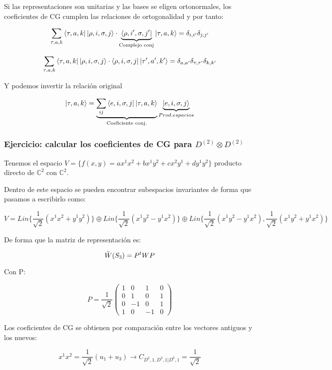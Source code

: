 \documentclass{article}
\begin{document}
\smallskip

Si las representaciones son unitarias y las bases se eligen ortonormales, los coeficientes de CG cumplen las relaciones de ortogonalidad y por tanto:


$$\sum_{\tau , a,k}\bra{\tau , a, k}\ket{\rho, i,  \sigma ,j } \cdot \underbrace{\bra{\rho, i',  \sigma ,j '}}_{\text{Complejo conj}} \ket{\tau , a, k}=\delta _{i,i'}\delta _{j,j'}$$

$$\sum_{\tau , a,k}\bra{\tau , a, k}\ket{\rho, i,  \sigma ,j } \cdot {\bra{\rho, i,  \sigma ,j }} \ket{\tau ' , a', k'}=\delta _{a,a'}\delta _{\tau,\tau '}\delta _{k, k'}$$


Y podemos invertir la relación original

$$\ket{\tau, a, k}=\underbrace{\sum _{ij} \bra{e,i, \sigma , j} \ket{ \tau , a ,k}}_{\text{Coeficiente conj.}} \underbrace{\ket{e,i,\sigma ,j}}_{Prod. espacios}$$

\subsubsection{Ejercicio: calcular los coeficientes de CG para $D^{(2)}\otimes D^{(2)}$}

Tenemos el espacio $V=\lbrace f(x,y)=ax^1x^2 + bx^1y^2 + c x^2y^1 +d y^1y^2\rbrace$ producto directo de $\mathds{C}^2$ con $\mathds{C}^2$.


Dentro de este espacio se pueden encontrar subespacios invariantes de forma que pasamos a escribirlo como:


$$V=Lin \lbrace \frac{1}{\sqrt{2}} (x^1x^2 + y^1y^2) \rbrace \oplus Lin \lbrace \frac{1}{\sqrt{2}}(x^1y^2 - y^1x^2)\rbrace \oplus Lin \lbrace \frac{1}{\sqrt{2}}(x^1y^2 - y^1x^2), \frac{1}{\sqrt{2}}(x^1y^2 + y^1x^2) \rbrace$$


De forma que la matriz de representación es:

$$\Tilde{W}(S_3)=P^tWP$$

Con P:

$$P=\frac{1}{\sqrt{2}}\left (\begin{array}{cccc}
1 & 0 & 1 & 0  \\
0 & 1 & 0 & 1  \\
0 & -1 & 0 & 1  \\
1 & 0 & -1 & 0
\end{array} \right)$$


Los coeficientes de CG se obtienen por comparación entre los vectores antiguos y los nuevos:

$$x^1x^2=\frac{1}{\sqrt{2}}(u_1+u_3) \to C_{D^2,1,D^2,1| D^0, 1}=\frac{1}{\sqrt{2}}$$
\end{document}
